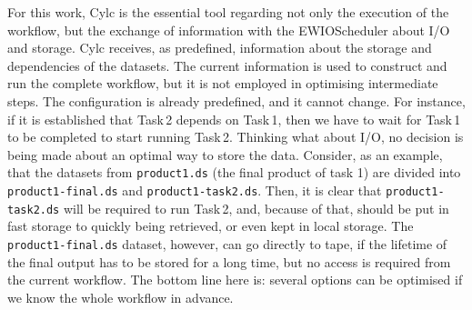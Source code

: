 \documentclass[a4paper]{article}
\begin{document}
For this work, Cylc is the essential tool regarding not only the execution of the workflow, but the exchange of information with the EWIOScheduler about I/O and storage.
Cylc receives, as predefined, information about the storage and dependencies of the datasets. The current information is used to construct and run the complete workflow, but it is not employed in optimising intermediate steps.
The configuration is already predefined, and it cannot change. For instance, if it is established that Task\,2 depends on Task\,1, then we have to wait for Task\,1 to be completed to start running Task\,2.
Thinking what about I/O, no decision is being made about an optimal way to store the data.
Consider, as an example, that the datasets from \texttt{product1.ds} (the final product of task 1) are divided into \texttt{product1-final.ds} and \texttt{product1-task2.ds}. Then, it is clear that \texttt{product1-task2.ds} will be required to run Task\,2, and, because of that, should be put in fast storage to quickly being retrieved, or even kept in local storage. The \texttt{product1-final.ds} dataset, however, can go directly to tape, if the lifetime of the final output has to be stored for a long time, but no access is required from the current workflow.
The bottom line here is: several options can be optimised if we know the whole workflow in advance.





\end{document}
